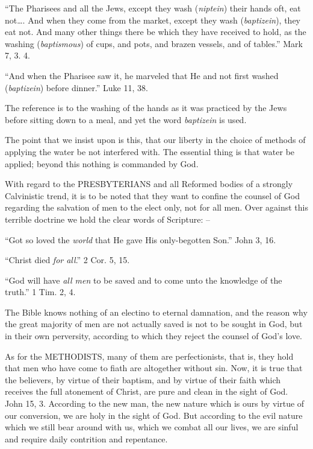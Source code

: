\documentclass[
]{book}
\begin{document}
``The Pharisees and all the Jews, except they wash (\emph{niptein}) their hands oft, eat not\ldots. And when they come from the market, except they wash (\emph{baptizein}), they eat not. And many other things there be which they have received to hold, as the washing (\emph{baptismous}) of cups, and pots, and brazen vessels, and of tables.'' Mark 7, 3. 4.

``And when the Pharisee saw it, he marveled that He and not first washed (\emph{baptizein}) before dinner.'' Luke 11, 38.

The reference is to the washing of the hands as it was practiced by the Jews before sitting down to a meal, and yet the word \emph{baptizein} is used.

The point that we insist upon is this, that our liberty in the choice of methods of applying the water be not interfered with. The essential thing is that water be applied; beyond this nothing is commanded by God.

With regard to the PRESBYTERIANS and all Reformed bodies of a strongly Calvinistic trend, it is to be noted that they want to confine the counsel of God regarding the salvation of men to the elect only, not for all men. Over against this terrible doctrine we hold the clear words of Scripture: --

``Got so loved the \emph{world} that He gave His only-begotten Son.'' John 3, 16.

``Christ died \emph{for all}.'' 2 Cor. 5, 15.

``God will have \emph{all men} to be saved and to come unto the knowledge of the truth.'' 1 Tim. 2, 4.

The Bible knows nothing of an electino to eternal damnation, and the reason why the great majority of men are not actually saved is not to be sought in God, but in their own perversity, according to which they reject the counsel of God's love.

As for the METHODISTS, many of them are perfectionists, that is, they hold that men who have come to fiath are altogether without sin. Now, it is true that the believers, by virtue of their baptism, and by virtue of their faith which receives the full atonement of Christ, are pure and clean in the sight of God. John 15, 3. According to the new man, the new nature which is ours by virtue of our conversion, we are holy in the sight of God. But according to the evil nature which we still bear around with us, which we combat all our lives, we are sinful and require daily contrition and repentance.
\end{document}
